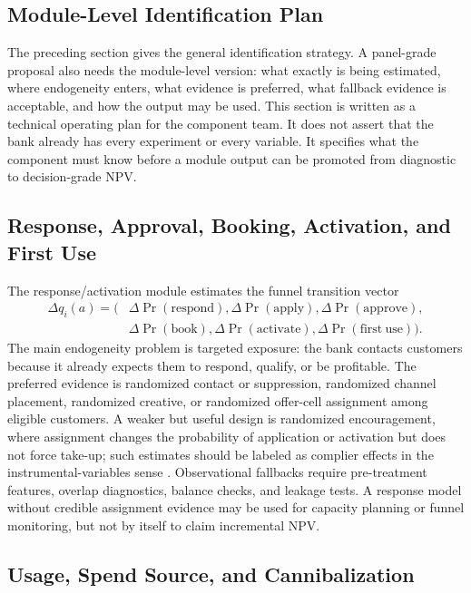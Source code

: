 \documentclass[11pt]{article}
\newcommand{\1}{\mathbf{1}}
\begin{document}
\subsection{Module-Level Identification Plan}
\label{sec:module-identification-plan}

The preceding section gives the general identification strategy. A panel-grade
proposal also needs the module-level version: what exactly is being estimated,
where endogeneity enters, what evidence is preferred, what fallback evidence
is acceptable, and how the output may be used. This section is written as a
technical operating plan for the component team. It does not assert that the
bank already has every experiment or every variable. It specifies what the
component must know before a module output can be promoted from diagnostic to
decision-grade NPV.

\subsection*{Response, Approval, Booking, Activation, and First Use}

The response/activation module estimates the funnel transition vector
\begin{align}
  \Delta q_i(a)
  =
  \big(&
    \Delta\Pr(\mathrm{respond}),
    \Delta\Pr(\mathrm{apply}),
    \Delta\Pr(\mathrm{approve}), \nonumber\\
  &
    \Delta\Pr(\mathrm{book}),
    \Delta\Pr(\mathrm{activate}),
    \Delta\Pr(\mathrm{first\ use})
  \big).
  \label{eq:funnel-transition-vector}
\end{align}
The main endogeneity problem is targeted exposure: the bank contacts customers
because it already expects them to respond, qualify, or be profitable. The
preferred evidence is randomized contact or suppression, randomized channel
placement, randomized creative, or randomized offer-cell assignment among
eligible customers. A weaker but useful design is randomized encouragement,
where assignment changes the probability of application or activation but does
not force take-up; such estimates should be labeled as complier effects in the
instrumental-variables sense \citep{angristimbensrubin1996iv}. Observational
fallbacks require pre-treatment features, overlap diagnostics, balance checks,
and leakage tests. A response model without credible assignment evidence may
be used for capacity planning or funnel monitoring, but not by itself to claim
incremental NPV.

\subsection*{Usage, Spend Source, and Cannibalization}
\end{document}
